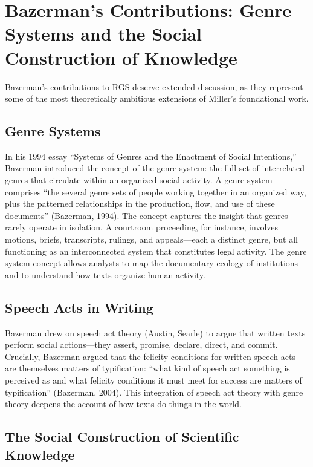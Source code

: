 \documentclass[12pt]{article}
\begin{document}
\section{Bazerman's Contributions: Genre Systems and the Social Construction of Knowledge}

Bazerman's contributions to RGS deserve extended discussion, as they represent some of the most theoretically ambitious extensions of Miller's foundational work.

\subsection{Genre Systems}

In his 1994 essay ``Systems of Genres and the Enactment of Social Intentions,'' Bazerman introduced the concept of the genre system: the full set of interrelated genres that circulate within an organized social activity. A genre system comprises ``the several genre sets of people working together in an organized way, plus the patterned relationships in the production, flow, and use of these documents'' (Bazerman, 1994). The concept captures the insight that genres rarely operate in isolation. A courtroom proceeding, for instance, involves motions, briefs, transcripts, rulings, and appeals---each a distinct genre, but all functioning as an interconnected system that constitutes legal activity. The genre system concept allows analysts to map the documentary ecology of institutions and to understand how texts organize human activity.

\subsection{Speech Acts in Writing}

Bazerman drew on speech act theory (Austin, Searle) to argue that written texts perform social actions---they assert, promise, declare, direct, and commit. Crucially, Bazerman argued that the felicity conditions for written speech acts are themselves matters of typification: ``what kind of speech act something is perceived as and what felicity conditions it must meet for success are matters of typification'' (Bazerman, 2004). This integration of speech act theory with genre theory deepens the account of how texts do things in the world.

\subsection{The Social Construction of Scientific Knowledge}
\end{document}
